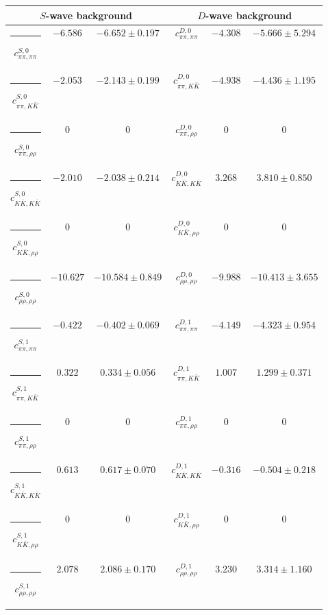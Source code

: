 \begin{table}[h]
\begin{ruledtabular}
\begin{tabular}{c c c c c c c c c}
\end{tabular}
\vspace{2em}
\begin{tabular}{c c c c c c}
\multicolumn{3}{c}{$S$-wave background}  & \multicolumn{3}{c}{$D$-wave background} \\ \hline
\rule[-0.2cm]{-0.1cm}{.55cm} $c^{S,0}_{\pi\pi,\pi\pi}$ &$-6.586$ & $-6.652 \pm 0.197$ & $c^{D,0}_{\pi\pi,\pi\pi}$ &$-4.308$ & $-5.666 \pm 5.294$ \\
\rule[-0.2cm]{-0.1cm}{.55cm} $c^{S,0}_{\pi\pi,K\bar K}$ &$-2.053$ & $-2.143 \pm 0.199$ & $c^{D,0}_{\pi\pi,K\bar K}$ &$-4.938$ & $-4.436 \pm 1.195$ \\
\rule[-0.2cm]{-0.1cm}{.55cm} $c^{S,0}_{\pi\pi,\rho\rho}$ &$0$ & $0$ & $c^{D,0}_{\pi\pi,\rho\rho}$ &$0$ & $0$ \\
\rule[-0.2cm]{-0.1cm}{.55cm} $c^{S,0}_{K\bar K,K\bar K}$ &$-2.010$ & $-2.038 \pm 0.214$ & $c^{D,0}_{K\bar K,K\bar K}$ &$3.268$ & $3.810 \pm 0.850$ \\
\rule[-0.2cm]{-0.1cm}{.55cm} $c^{S,0}_{K\bar K,\rho\rho}$ &$0$ & $0$ & $c^{D,0}_{K\bar K,\rho\rho}$ &$0$ & $0$ \\
\rule[-0.2cm]{-0.1cm}{.55cm} $c^{S,0}_{\rho\rho,\rho\rho}$ &$-10.627$ & $-10.584 \pm 0.849$ & $c^{D,0}_{\rho\rho,\rho\rho}$ &$-9.988$ & $-10.413 \pm 3.655$ \\
\rule[-0.2cm]{-0.1cm}{.55cm} $c^{S,1}_{\pi\pi,\pi\pi}$ &$-0.422$ & $-0.402 \pm 0.069$ & $c^{D,1}_{\pi\pi,\pi\pi}$ &$-4.149$ & $-4.323 \pm 0.954$ \\
\rule[-0.2cm]{-0.1cm}{.55cm} $c^{S,1}_{\pi\pi,K\bar K}$ &$0.322$ & $0.334 \pm 0.056$ & $c^{D,1}_{\pi\pi,K\bar K}$ &$1.007$ & $1.299 \pm 0.371$ \\
\rule[-0.2cm]{-0.1cm}{.55cm} $c^{S,1}_{\pi\pi,\rho\rho}$ &$0$ & $0$ & $c^{D,1}_{\pi\pi,\rho\rho}$ &$0$ & $0$ \\
\rule[-0.2cm]{-0.1cm}{.55cm} $c^{S,1}_{K\bar K,K\bar K}$ &$0.613$ & $0.617 \pm 0.070$ & $c^{D,1}_{K\bar K,K\bar K}$ &$-0.316$ & $-0.504 \pm 0.218$ \\
\rule[-0.2cm]{-0.1cm}{.55cm} $c^{S,1}_{K\bar K,\rho\rho}$ &$0$ & $0$ & $c^{D,1}_{K\bar K,\rho\rho}$ &$0$ & $0$ \\
\rule[-0.2cm]{-0.1cm}{.55cm} $c^{S,1}_{\rho\rho,\rho\rho}$ &$2.078$ & $2.086 \pm 0.170$ & $c^{D,1}_{\rho\rho,\rho\rho}$ &$3.230$ & $3.314 \pm 1.160$ \\
\end{tabular}
\end{ruledtabular}
\end{table}
